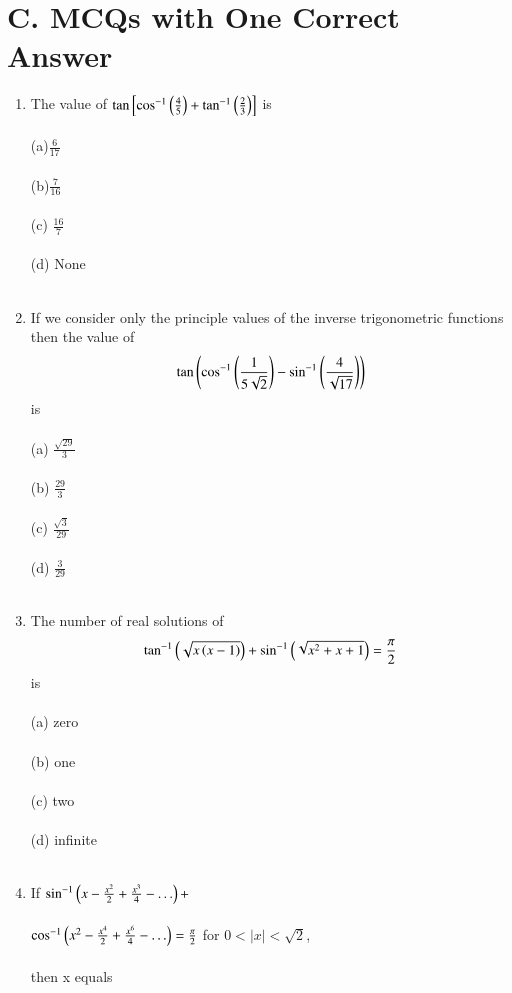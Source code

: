 \documentclass[journal,12pt,twocolumn]{IEEEtran}
\theoremstyle{remark}
\begin{document}
\section*{C. MCQs with One Correct Answer}
\begin{enumerate}
\item The value of $\tan \left[ \cos ^{-1}\left(\frac{4}{5}\right)+\tan^{-1}\left(\frac{2}{3}\right) \right]$ is
\hfill {}\\\\
(a)$\frac{6}{17}$ \\\\(b)$\frac{7}{16}$ \\\\(c) $\frac{16}{7}$ \\\\(d) None\\\\
\item If we consider only the principle values of the inverse trigonometric functions then the value of 
$$\tan \left(\cos ^{-1}\left(\frac{1}{5\sqrt{2}}\right)-\sin ^{-1}\left(\frac{4}{\sqrt{17}}\right)\right)$$ is
\hfill {}\\\\
(a) $\frac{\sqrt{29}}{3}$ \\\\(b) $\frac{29}{3}$ \\\\(c) $\frac{\sqrt{3}}{29}$ \\\\(d) $\frac{3}{29}$ \\\\
\item The number of real solutions of 
$$\tan ^{-1}\left(\sqrt{x\left(x-1\right)}\right)+\sin ^{-1}\left(\sqrt{x^2+x+1}\right)=\frac{\pi}{2}$$ is 
\hfill {}\\\\
(a) zero \\\\(b) one \\\\(c) two \\\\(d) infinite\\\\
\item If $\sin ^{-1}\left(x-\frac{x^2}{2}+\frac{x^3}{4}-\ldots\right)+ $\\\\$\cos ^{-1}\left(x^2-\frac{x^4}{2}+\frac{x^6}{4}-\ldots\right)=\frac{\pi}{2}$ for $0<|x|<\sqrt{2}$,\\\\ then x equals 

\end{enumerate}
\end{document}
